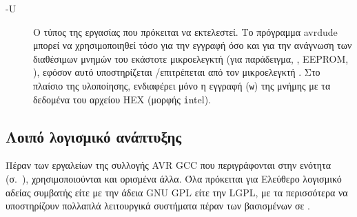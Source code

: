 \begin{enumerate}
\begin{description}
        \item[-U] Ο τύπος της εργασίας που πρόκειται να εκτελεστεί. Το πρόγραμμα
        avrdude μπορεί να χρησιμοποιηθεί τόσο για την εγγραφή όσο και για την
        ανάγνωση των διαθέσιμων μνημών του εκάστοτε μικροελεγκτή (για
        παράδειγμα, , EEPROM, ), εφόσον αυτό υποστηρίζεται%
        \slash{}επιτρέπεται από τον μικροελεγκτή \parencite{avrdude}. Στο
        πλαίσιο της υλοποίησης, ενδιαφέρει μόνο η εγγραφή (\verb~w~) της μνήμης
         με τα δεδομένα του αρχείου HEX (μορφής \verb~i~ntel).
    \end{description}

\end{enumerate}


\subsection{Λοιπό λογισμικό ανάπτυξης}

Πέραν των εργαλείων της συλλογής AVR GCC που περιγράφονται στην ενότητα
 (σ.~\pageref{subsubsec:avr:toolchain}),
χρησιμοποιούνται και ορισμένα άλλα. Όλα πρόκειται για Ελεύθερο λογισμικό αδείας
συμβατής είτε με την άδεια GNU GPL είτε την LGPL, με τα περισσότερα να
υποστηρίζουν πολλαπλά λειτουργικά συστήματα πέραν των βασισμένων σε .

